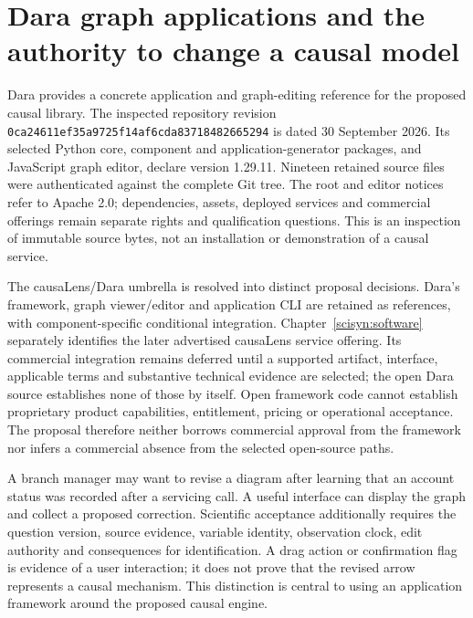 \section{Dara graph applications and the authority to change a causal model}
\label{sec:exec25-dara-reuse}
Dara provides a concrete application and graph-editing reference for the
proposed causal library. The inspected repository revision
\texttt{0ca24611ef35a9725f14a}\allowbreak\texttt{f6cda83718482665294}
is dated 30 September 2026. Its selected Python core, component and
application-generator packages, and JavaScript graph editor, declare version
1.29.11. Nineteen retained source files were authenticated against the complete
Git tree. The root and editor notices refer to Apache 2.0; dependencies,
assets, deployed services and commercial offerings remain separate rights and
qualification questions. This is an inspection of immutable source bytes,
not an installation or demonstration of a causal service.
\citep{exec25_dara_source}

The causaLens/Dara umbrella is resolved into distinct proposal decisions.
Dara's framework, graph viewer/editor and application CLI are retained as
references, with component-specific conditional integration. Chapter~\ref{scisyn:software} separately identifies the later advertised
causaLens service offering. Its commercial integration remains deferred until
a supported artifact, interface, applicable terms and substantive technical
evidence are selected; the open Dara source establishes none of those by itself.
Open framework code cannot establish proprietary product capabilities,
entitlement, pricing or operational acceptance. The proposal therefore neither
borrows commercial approval from the framework nor infers a commercial
absence from the selected open-source paths.~\citep{exec25_dara_choice}

A branch manager may want to revise a diagram after learning that an account
status was recorded after a servicing call. A useful interface can display the
graph and collect a proposed correction. Scientific acceptance additionally
requires the question version, source evidence, variable identity, observation
clock, edit authority and consequences for identification. A drag action or
confirmation flag is evidence of a user interaction; it does not prove that
the revised arrow represents a causal mechanism. This distinction is central
to using an application framework around the proposed causal engine.
\citep{exec25_dara_choice}

